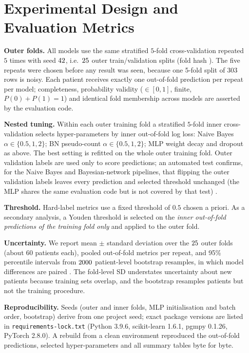 \documentclass[conference]{IEEEtran}
\begin{document}
\section{Experimental Design and Evaluation Metrics}
\textbf{Outer folds.} All models use the same stratified $5$-fold cross-validation repeated $5$ times with seed $42$, i.e.\ $25$ outer train/validation splits (fold hash \texttt{\foldHash}). The five repeats were chosen before any result was seen, because one 5-fold split of 303 rows is noisy. Each patient receives exactly one out-of-fold prediction per repeat per model; completeness, probability validity ($\in[0,1]$, finite, $P(0)+P(1)=1$) and identical fold membership across models are asserted by the evaluation code.

\textbf{Nested tuning.} Within each outer training fold a stratified $5$-fold inner cross-validation selects hyper-parameters by inner out-of-fold log loss: Naive Bayes $\alpha\in\{0.5,1,2\}$; BN pseudo-count $\alpha\in\{0.5,1,2\}$; MLP weight decay and dropout as above. The best setting is refitted on the whole outer training fold. Outer validation labels are used only to score predictions; an automated test confirms, for the Naive Bayes and Bayesian-network pipelines, that flipping the outer validation labels leaves every prediction and selected threshold unchanged (the MLP shares the same evaluation code but is not covered by that test) \cite{varma2006,cawley2010}.

\textbf{Threshold.} Hard-label metrics use a fixed threshold of $0.5$ chosen a priori. As a secondary analysis, a Youden threshold is selected on the \emph{inner out-of-fold predictions of the training fold only} and applied to the outer fold.

\textbf{Uncertainty.} We report mean $\pm$ standard deviation over the $25$ outer folds (about 60 patients each), pooled out-of-fold metrics per repeat, and 95\% percentile intervals from $2000$ patient-level bootstrap resamples, in which model differences are paired \cite{efron1993}. The fold-level SD understates uncertainty about new patients because training sets overlap, and the bootstrap resamples patients but not the training procedure.

\textbf{Reproducibility.} Seeds (outer and inner folds, MLP initialisation and batch order, bootstrap) derive from one project seed; exact package versions are listed in \texttt{requirements-lock.txt} (Python 3.9.6, scikit-learn 1.6.1, pgmpy 0.1.26, PyTorch 2.8.0). A rebuild from a clean environment reproduced the out-of-fold predictions, selected hyper-parameters and all summary tables byte for byte.
\end{document}

